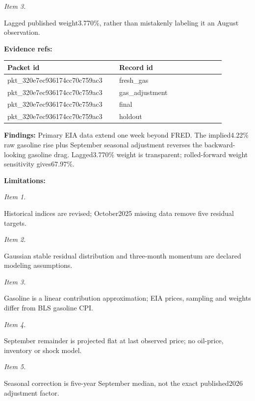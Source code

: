 \documentclass[11pt]{article}
\begin{document}
\par\noindent\textit{Item 3.}\par Lagged published weight3.770\%, rather than mistakenly labeling it an August observation.

\par\noindent\textbf{Evidence refs:} \par \begin{longtable}{>{\raggedright\arraybackslash}p{0.440\linewidth}>{\raggedright\arraybackslash}p{0.440\linewidth}}
Packet id & Record id \\ \hline\endhead
pkt\_320e7ec936174cc70c759ac3 & fresh\_gas \\
pkt\_320e7ec936174cc70c759ac3 & gas\_adjustment \\
pkt\_320e7ec936174cc70c759ac3 & final \\
pkt\_320e7ec936174cc70c759ac3 & holdout \\
\end{longtable}

\par\noindent\textbf{Findings:} Primary EIA data extend one week beyond FRED. The implied4.22\% raw gasoline rise plus September seasonal adjustment reverses the backward-looking gasoline drag. Lagged3.770\% weight is transparent; rolled-forward weight sensitivity gives67.97\%.

\par\noindent\textbf{Limitations:} \par \par\noindent\textit{Item 1.}\par Historical indices are revised; October2025 missing data remove five residual targets.

\par\noindent\textit{Item 2.}\par Gaussian stable residual distribution and three-month momentum are declared modeling assumptions.

\par\noindent\textit{Item 3.}\par Gasoline is a linear contribution approximation; EIA prices, sampling and weights differ from BLS gasoline CPI.

\par\noindent\textit{Item 4.}\par September remainder is projected flat at last observed price; no oil-price, inventory or shock model.

\par\noindent\textit{Item 5.}\par Seasonal correction is five-year September median, not the exact published2026 adjustment factor.
\end{document}
